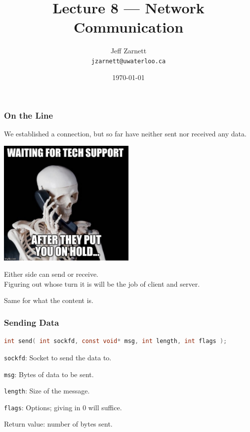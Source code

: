 

\title{Lecture 8 --- Network Communication }

\author{Jeff Zarnett \\ \small \texttt{jzarnett@uwaterloo.ca}}
\date{\today}




\begin{frame}
	\titlepage

\end{frame}



\begin{frame}
	\frametitle{On the Line}

	We established a connection, but so far have neither sent nor received any data.

	\begin{center}
		\includegraphics[width=0.5\textwidth]{images/onhold.jpg}
	\end{center}

	Either side can send or receive.\\
	\quad Figuring out whose turn it is will be the job of client and server.

	Same for what the content is.

\end{frame}



\begin{frame}[fragile]
	\frametitle{Sending Data}

	\begin{lstlisting}[language=C]
int send( int sockfd, const void* msg, int length, int flags );
\end{lstlisting}

	\texttt{sockfd}: Socket to send the data to.

	\texttt{msg}: Bytes of data to be sent.

	\texttt{length}: Size of the message.

	\texttt{flags}: Options; giving in 0 will suffice.

	Return value: number of bytes sent.

\end{frame}



